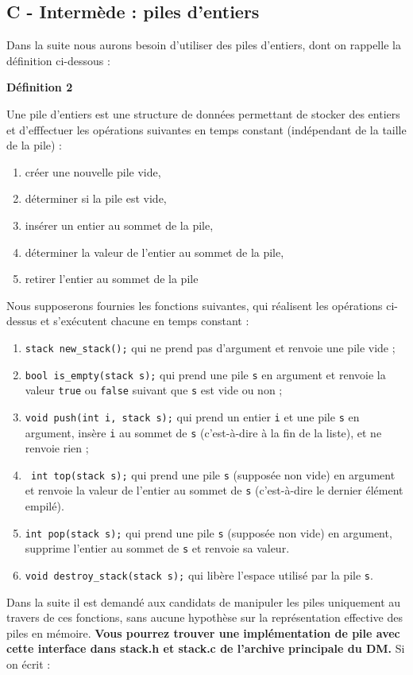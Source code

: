 \documentclass[a4paper,french,bookmarks]{article}
\begin{document}
\subsection*{C - Intermède : piles d’entiers}
Dans la suite nous aurons besoin d’utiliser des piles d’entiers, dont on rappelle la définition ci-dessous :

\textbf{Définition 2} \begin{itshape}
Une pile d’entiers est une structure de données permettant de stocker des entiers et d’efffectuer les opérations suivantes en temps constant (indépendant de la taille de la pile) :
\begin{enumerate}
    \item[\bullet] créer une nouvelle pile vide,
    \item[\bullet] déterminer si la pile est vide,
    \item[\bullet] insérer un entier au sommet de la pile,
    \item[\bullet] déterminer la valeur de l’entier au sommet de la pile,
    \item[\bullet] retirer l’entier au sommet de la pile
\end{enumerate}
\end{itshape}
Nous supposerons fournies les fonctions suivantes, qui réalisent les opérations ci-dessus et s’exécutent chacune en temps constant :
\begin{enumerate}
    \item[\bullet] \verb|stack new_stack();| qui ne prend pas d’argument et renvoie une pile vide ;
    \item[\bullet] \verb|bool is_empty(stack s);| qui prend une pile \verb|s| en argument et renvoie la valeur \verb|true| ou \verb|false| suivant que \verb|s| est vide ou non ;
    \item[\bullet] \verb|void push(int i, stack s);| qui prend un entier \verb|i| et une pile \verb|s| en argument, insère \verb|i| au sommet de \verb|s| (c’est-à-dire à la fin de la liste), et ne renvoie rien ;
    \item[\bullet] \verb| int top(stack s);| qui prend une pile \verb|s| (supposée non vide) en argument et renvoie la valeur de l’entier au sommet de \verb|s| (c’est-à-dire le dernier élément empilé).
    \item[\bullet] \verb|int pop(stack s);| qui prend une pile \verb|s| (supposée non vide) en argument, supprime l’entier au sommet de \verb|s| et renvoie sa valeur.
    \item[\bullet] \verb|void destroy_stack(stack s);| qui libère l’espace utilisé par la pile \verb|s|.
\end{enumerate}
Dans la suite il est demandé aux candidats de manipuler les piles uniquement au travers de ces
fonctions, sans aucune hypothèse sur la représentation effective des piles en mémoire. \textbf{Vous pourrez trouver une implémentation de pile avec cette interface dans stack.h et
stack.c de l’archive principale du DM.} Si on écrit :
\end{document}
